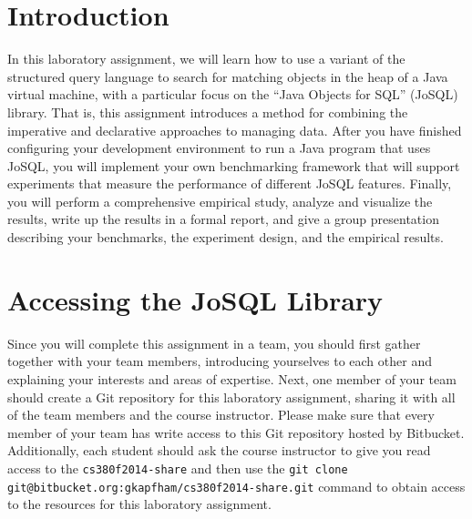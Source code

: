 


\usepackage[compact]{titlesec}



\section*{Introduction}

In this laboratory assignment, we will learn how to use a variant of the structured query language to search for
matching objects in the heap of a Java virtual machine, with a particular focus on the ``Java Objects for SQL'' (JoSQL)
library. That is, this assignment introduces a method for combining the imperative and declarative approaches to
managing data. After you have finished configuring your development environment to run a Java program that uses JoSQL,
you will implement your own benchmarking framework that will support experiments that measure the performance of
different JoSQL features.  Finally, you will perform a comprehensive empirical study, analyze and visualize the results,
write up the results in a formal report, and give a group presentation describing your benchmarks, the experiment
design, and the empirical results.

\section*{Accessing the JoSQL Library}

Since you will complete this assignment in a team, you should first gather together with your team members, introducing
yourselves to each other and explaining your interests and areas of expertise. Next, one member of your team should
create a Git repository for this laboratory assignment, sharing it with all of the team members and the course
instructor. Please make sure that every member of your team has write access to this Git repository hosted by Bitbucket.
Additionally, each student should ask the course instructor to give you read access to the {\tt cs380f2014-share} and
then use the {\tt git clone git@bitbucket.org:gkapfham/cs380f2014-share.git} command to obtain access to the resources
for this laboratory assignment.

